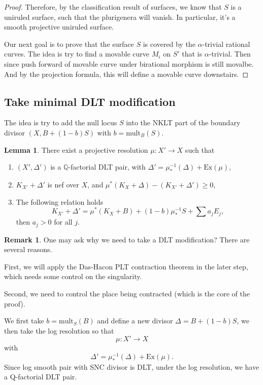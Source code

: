 \documentclass[11pt]{article}
\theoremstyle{definition}
\newtheorem{lemma}[theorem]{Lemma}
\newtheorem{remark}[theorem]{Remark}
\begin{document}
\begin{proof}
		Therefore, by the classification result of surfaces, we know that $S$ is a uniruled surface, such that the plurigenera will vanish. In particular, it's a smooth projective uniruled surface. 
		
		Our next goal is to prove that the surface $S$ is covered by the $\alpha$-trivial rational curves. The idea is try to find a movable curve $M_i$ on $S'$ that is $\alpha$-trivial. Then since push forward of movable curve under birational morphism is still movalbe. And by the projection formula, this will define a movable curve downstairs. 
	\end{proof}
	
	\subsection{Take minimal DLT modification}
	The idea is try to add the null locus $S$ into the NKLT part of the boundary divisor $(X, B+ (1-b)S)$ with $b = \text{mult}_B(S)$.
	\begin{lemma}\label{DLTmod}
		There exist a projective resolution $\mu:X' \to X$ such that
		\begin{enumerate}
			\item $(X',\Delta')$ is a $\mathbb{Q}$-factorial DLT pair, with $\Delta' = \mu^{-1}_* (\Delta)+ \text{Ex}(\mu)$,
			\item $K_{X'}+\Delta'$ is nef over $X$, and $\mu^* (K_{X}+\Delta) - (K_{X'}+ \Delta')\ge 0$,
			\item The following relation holds $$K_{X'}+ \Delta'= \mu^* (K_X+B) + (1-b) \mu^{-1}_* S + \sum a_j E_j,$$then $a_j >0$ for all $j$. 
		\end{enumerate}
	\end{lemma}
	\begin{remark}
		One may ask why we need to take a DLT modification? There are several reasons. 
		
		First, we will apply the Das-Hacon PLT contraction theorem in the later step, which needs some control on the singularity. 
		
		Second, we need to control the place being contracted (which is the core of the proof). 
	\end{remark}
	We first take $b = \text{mult}_S (B)$ and define a new divisor $\Delta = B + (1-b)S$, we then take the log resolution so that $$\mu: X' \to X$$with $$\Delta ' = \mu^{-1}_* (\Delta) + \text{Ex}(\mu).$$Since log smooth pair with SNC divisor is DLT, under the log resolution, we have a Q-factorial DLT pair.
	
\end{document}
